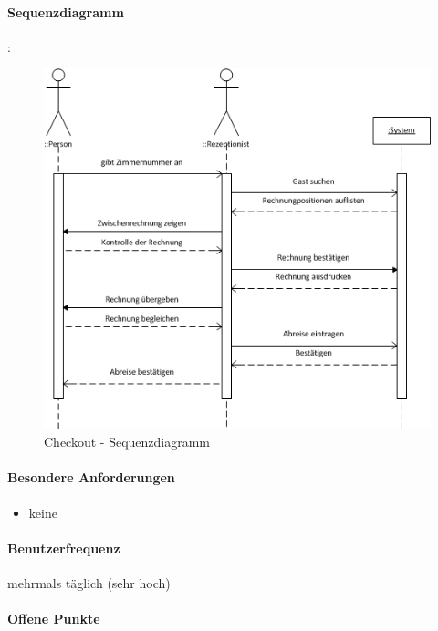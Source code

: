 \paragraph{Sequenzdiagramm}
:\\
\begin{figure}[h]
	\includegraphics{Images/SSD_Checkout.png}
	\caption{Checkout - Sequenzdiagramm}
\end{figure}
\paragraph{Besondere Anforderungen}
\begin{itemize}
	\item keine
\end{itemize}

\paragraph{Benutzerfrequenz}
mehrmals täglich (sehr hoch)

\paragraph{Offene Punkte}

\newpage
